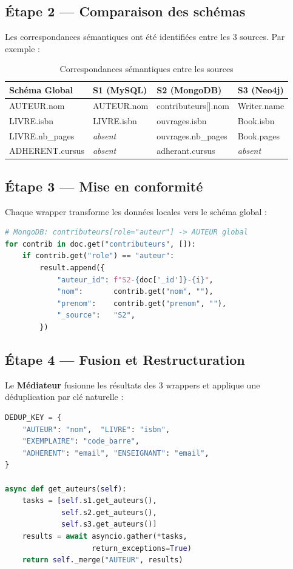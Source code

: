 \documentclass[12pt,a4paper]{article}
\begin{document}
\subsection{Étape 2 — Comparaison des schémas}
Les correspondances sémantiques ont été identifiées entre les 3 sources. Par exemple :

\begin{table}[H]
\centering
\begin{tabular}{llll}
\toprule
\textbf{Schéma Global} & \textbf{S1 (MySQL)} & \textbf{S2 (MongoDB)} & \textbf{S3 (Neo4j)} \\
\midrule
AUTEUR.nom & AUTEUR.nom & contributeurs[].nom & Writer.name \\
LIVRE.isbn & LIVRE.isbn & ouvrages.isbn & Book.isbn \\
LIVRE.nb\_pages & \textit{absent} & ouvrages.nb\_pages & Book.pages \\
ADHERENT.cursus & \textit{absent} & adherant.cursus & \textit{absent} \\
\bottomrule
\end{tabular}
\caption{Correspondances sémantiques entre les sources}
\end{table}

\subsection{Étape 3 — Mise en conformité}
Chaque wrapper transforme les données locales vers le schéma global :

\begin{lstlisting}[language=Python, caption=Mise en conformité dans WrapperS2 (MongoDB)]
# MongoDB: contributeurs[role="auteur"] -> AUTEUR global
for contrib in doc.get("contributeurs", []):
    if contrib.get("role") == "auteur":
        result.append({
            "auteur_id": f"S2-{doc['_id']}-{i}",
            "nom":       contrib.get("nom", ""),
            "prenom":    contrib.get("prenom", ""),
            "_source":   "S2",
        })
\end{lstlisting}

\subsection{Étape 4 — Fusion et Restructuration}
Le \textbf{Médiateur} fusionne les résultats des 3 wrappers et applique une déduplication par clé naturelle :

\begin{lstlisting}[language=Python, caption=Fusion dans le Médiateur]
DEDUP_KEY = {
    "AUTEUR": "nom",  "LIVRE": "isbn",
    "EXEMPLAIRE": "code_barre",
    "ADHERENT": "email", "ENSEIGNANT": "email",
}

async def get_auteurs(self):
    tasks = [self.s1.get_auteurs(),
             self.s2.get_auteurs(),
             self.s3.get_auteurs()]
    results = await asyncio.gather(*tasks,
                    return_exceptions=True)
    return self._merge("AUTEUR", results)
\end{lstlisting}
\end{document}
